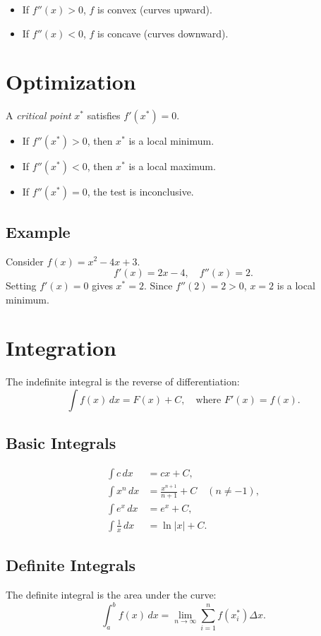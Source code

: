 \documentclass[11pt,letterpaper]{article}
\begin{document}
\begin{itemize}
    \item If $f''(x) > 0$, $f$ is convex (curves upward).
    \item If $f''(x) < 0$, $f$ is concave (curves downward).
\end{itemize}

\section*{Optimization}

A \emph{critical point} $x^*$ satisfies $f'(x^*) = 0$.

\begin{itemize}
    \item If $f''(x^*) > 0$, then $x^*$ is a local minimum.
    \item If $f''(x^*) < 0$, then $x^*$ is a local maximum.
    \item If $f''(x^*) = 0$, the test is inconclusive.
\end{itemize}

\subsection*{Example}
Consider $f(x) = x^2 - 4x + 3$.  
\[
f'(x) = 2x - 4, \quad f''(x) = 2.
\]
Setting $f'(x) = 0$ gives $x^* = 2$. Since $f''(2) = 2 > 0$, $x=2$ is a local minimum.  

\section*{Integration}

The indefinite integral is the reverse of differentiation:
\[
\int f(x)\, dx = F(x) + C, \quad \text{where } F'(x) = f(x).
\]

\subsection*{Basic Integrals}
\begin{align*}
\int c\, dx &= cx + C, \\
\int x^n\, dx &= \frac{x^{n+1}}{n+1} + C \quad (n \neq -1), \\
\int e^x\, dx &= e^x + C, \\
\int \frac{1}{x}\, dx &= \ln|x| + C.
\end{align*}

\subsection*{Definite Integrals}
The definite integral is the area under the curve:
\[
\int_a^b f(x)\, dx = \lim_{n \to \infty} \sum_{i=1}^n f(x_i^*) \Delta x.
\]
\end{document}
